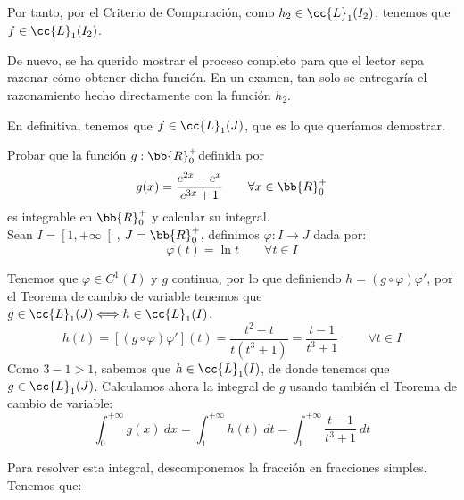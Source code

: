\begin{ejercicio}
\begin{itemize}
        Por tanto, por el Criterio de Comparación, como $h_2\in \cc{L}_1(I_2)$, tenemos que $f\in \cc{L}_1(I_2)$.
        \begin{observacion}
            De nuevo, se ha querido mostrar el proceso completo para que el lector sepa razonar cómo obtener dicha función.
            En un examen, tan solo se entregaría el razonamiento hecho directamente con la función $h_2$.
        \end{observacion}
    \end{itemize}
    En definitiva, tenemos que $f\in \cc{L}_1(J)$, que es lo que queríamos demostrar.
\end{ejercicio}

\begin{ejercicio} Probar que la función $g:\bb{R}_0^+$definida por
    \begin{equation*}
        g(x) = \frac{e^{2x}-e^x}{e^{3x}+1}
        \qquad \forall x\in \bb{R}_0^+
    \end{equation*}
    es integrable en $\bb{R}_0^+$ y calcular su integral.\\

    Sean $I=\left[1,+\infty\right[$, $J=\bb{R}^+_0$, definimos $\varphi:I\longrightarrow J$ dada por:
    \begin{equation*}
        \varphi(t) = \ln t \qquad \forall t\in I
    \end{equation*}
    
    Tenemos que $\varphi \in C^1(I)$ y $g$ continua, por lo que definiendo $h=(g\circ \varphi)\varphi'$, por el Teorema de cambio de variable tenemos que $g\in \cc{L}_1(J)\Longleftrightarrow h\in \cc{L}_1(I)$.
    \begin{equation*}
        h(t) = [(g\circ \varphi)\varphi'](t) = \dfrac{t^2-t}{t(t^3+1)} = \dfrac{t-1}{t^3 + 1} \hspace{1cm} \forall t\in I
    \end{equation*}
    Como $3-1>1$, sabemos que $h\in \cc{L}_1(I)$, de donde tenemos que $g\in \cc{L}_1(J)$. Calculamos ahora la integral de $g$ usando también el Teorema de cambio de variable:
    \begin{equation*}
        \int_0^{+\infty} g(x)~dx = \int_1^{+\infty} h(t)~dt = \int_1^{+\infty} \dfrac{t-1}{t^3+1}~dt
    \end{equation*}

    Para resolver esta integral, descomponemos la fracción en fracciones simples. Tenemos que:
    \begin{figure}[H]
        \centering
    \end{figure}


\end{ejercicio}
